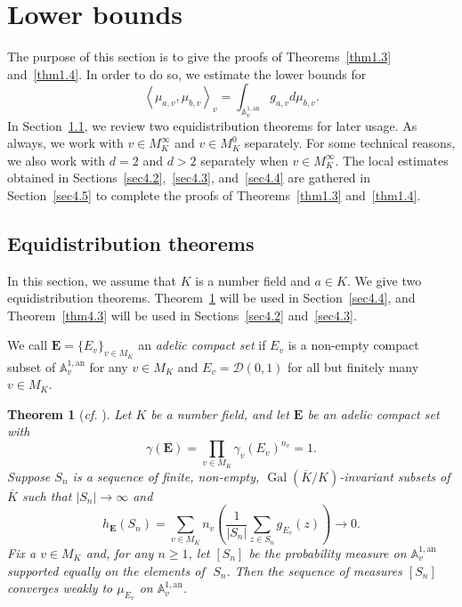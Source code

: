 \documentclass[11pt]{amsart}
\numberwithin{equation}{section}
\theoremstyle{plain}
\newtheorem{thm}{Theorem}[section]
\theoremstyle{definition}
\theoremstyle{remark}
\DeclareMathOperator{\Gal}{Gal}
\newcommand{\A}{\mathbb A}
\newcommand{\an}{\mathrm{an}}
\renewcommand{\bar}{\overline}
\begin{document}
\section{Lower bounds}\label{sec4}

The purpose of this section is to give the proofs of Theorems~\ref{thm1.3}
and~\ref{thm1.4}. In order to do so, we estimate the lower bounds
for
\[
\left\langle \mu_{a,v},\mu_{b,v}\right\rangle _{v}=\int_{\A_{v}^{1,\an}}g_{a,v}d\mu_{b,v}.
\]
In Section~\ref{sec4.1}, we review two equidistribution theorems
for later usage. As always, we work with $v\in M_{K}^{\infty}$ and
$v\in M_{K}^{0}$ separately. For some technical reasons, we also
work with $d=2$ and $d>2$ separately when $v\in M_{K}^{\infty}$.
The local estimates obtained in Sections~\ref{sec4.2},~\ref{sec4.3},
and~\ref{sec4.4} are gathered in Section~\ref{sec4.5} to complete
the proofs of Theorems~\ref{thm1.3} and~\ref{thm1.4}.

\subsection{Equidistribution theorems}\label{sec4.1}

In this section, we assume that $K$ is a number field and $a\in K$.
We give two equidistribution theorems. Theorem~\ref{thm4.1} will
be used in Section~\ref{sec4.4}, and Theorem~\ref{thm4.3} will be
used in Sections~\ref{sec4.2} and~\ref{sec4.3}.

We call $\boldsymbol{E}=\{E_{v}\}_{v\in M_{K}}$ an \textit{adelic
compact set} if $E_{v}$ is a non-empty compact subset of $\A_{v}^{1,\an}$
for any $v\in M_{K}$ and $E_{v}=\mathcal{D}(0,1)$ for all but finitely
many $v\in M_{K}$.

\begin{thm}[\textit{cf.} {\cite[Theorem 7.52]{BR2}}]\label{thm4.1}
Let $K$ be a number field, and let $\boldsymbol{E}$ be an adelic compact set with
\[
\gamma(\boldsymbol{E})=\prod_{v\in M_{K}}\gamma_{v}(E_{v})^{n_{v}}=1.
\]
Suppose $S_{n}$ is a sequence of finite, non-empty, $\Gal(\bar{K}/K)$-invariant
subsets of\, $\bar{K}$ such that $|S_{n}|\to\infty$ and
\[
h_{\boldsymbol{E}}(S_{n})=\sum_{v\in M_{K}}n_{v}\left(\frac{1}{|S_{n}|}\sum_{z\in S_{n}}g_{E_{v}}(z)\right)\longrightarrow 0.
\]
Fix a $v\in M_{K}$ and, for any $n\geq1$, let $[S_{n}]$ be the probability
measure on $\A_{v}^{1,\an}$ supported equally on
the elements of\,~$S_{n}$. Then the sequence of measures $[S_{n}]$
converges weakly to $\mu_{E_{v}}$ on $\A_{v}^{1,\an}$.
\end{thm}
\end{document}
